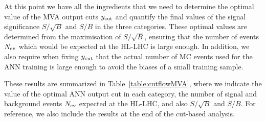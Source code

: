 At this point we have all the ingredients that we need to determine the optimal
value of the MVA output cuts $y_{\rm cut}$
and quantify the final values of the signal
significance $S/\sqrt{B}$ and $S/B$ in the three categories.
%
These optimal values are determined from the maximisation of $S/\sqrt{B}$,
ensuring that the number of events $N_{\rm ev}$
which would be expected at the HL-LHC is large
enough.
%
In addition, we also require when fixing $y_{\rm cut}$
that the actual number of MC events used for the ANN training
is large enough to avoid the biases of a small training sample.

These results are summarized in Table~\ref{table:cutflowMVA}, where we indicate
the value of the optimal ANN output
cut in each category,
the number of signal and background events $N_{\rm ev}$ expected
at the HL-LHC,
and also $S/\sqrt{B}$ and $S/B$.
%
For reference, we also include the results at the end of
the cut-based
analysis.
%


